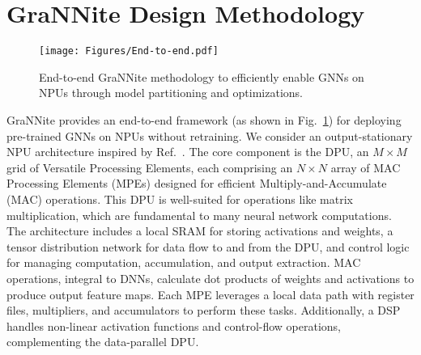 \section{GraNNite Design Methodology}\label{sec:Design}

\begin{figure}[t!]
\begin{center}
\texttt{[image: Figures/End-to-end.pdf]}%
\end{center}
\caption{End-to-end GraNNite methodology to efficiently enable GNNs on NPUs through model partitioning and optimizations.}\label{fig:end_to_end}
\end{figure}

GraNNite provides an end-to-end framework (as shown in Fig.~\ref{fig:end_to_end}) for deploying pre-trained GNNs on NPUs without retraining.
We consider an output-stationary NPU architecture inspired by Ref.~\cite{flexnn}. The core component is the DPU, an $M\times M$ grid of Versatile Processing Elements,  each comprising an $N\times N$ array of MAC Processing Elements (MPEs) designed for efficient Multiply-and-Accumulate (MAC) operations. This DPU is well-suited for operations like matrix multiplication, which are fundamental to many neural network computations.
The architecture includes a local SRAM for storing activations and weights, a tensor distribution network for data flow to and from the DPU, and control logic for managing computation, accumulation, and output extraction. MAC operations, integral to DNNs, calculate dot products of weights and activations to produce output feature maps. Each MPE leverages a local data path with register files, multipliers, and accumulators to perform these tasks. Additionally, a DSP handles non-linear activation functions and control-flow operations, complementing the data-parallel DPU.
